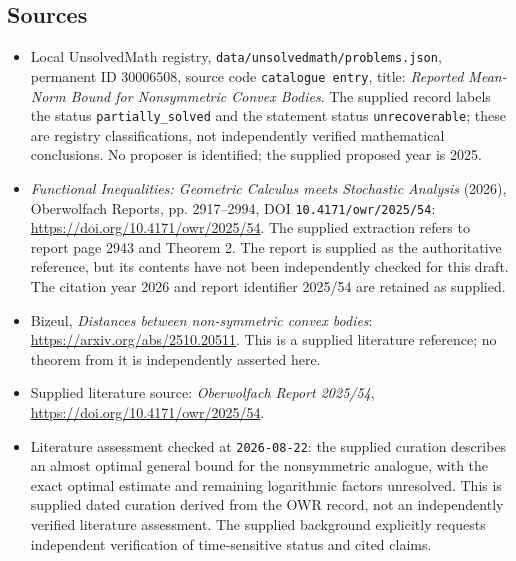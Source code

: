 \documentclass[11pt]{article}
\begin{document}
\subsection{Sources}
\begin{itemize}
\item Local UnsolvedMath registry, \texttt{data/unsolvedmath/problems.json}, permanent ID \(30006508\), source code \texttt{catalogue entry}, title: \emph{Reported Mean-Norm Bound for Nonsymmetric Convex Bodies}. The supplied record labels the status \texttt{partially\_solved} and the statement status \texttt{unrecoverable}; these are registry classifications, not independently verified mathematical conclusions. No proposer is identified; the supplied proposed year is 2025.
\item \emph{Functional Inequalities: Geometric Calculus meets Stochastic Analysis} (2026), Oberwolfach Reports, pp. 2917--2994, DOI \texttt{10.4171/owr/2025/54}: \url{https://doi.org/10.4171/owr/2025/54}. The supplied extraction refers to report page 2943 and Theorem 2. The report is supplied as the authoritative reference, but its contents have not been independently checked for this draft. The citation year 2026 and report identifier 2025/54 are retained as supplied.
\item Bizeul, \emph{Distances between non-symmetric convex bodies}: \url{https://arxiv.org/abs/2510.20511}. This is a supplied literature reference; no theorem from it is independently asserted here.
\item Supplied literature source: \emph{Oberwolfach Report 2025/54}, \url{https://doi.org/10.4171/owr/2025/54}.
\item Literature assessment checked at \texttt{2026-08-22}: the supplied curation describes an almost optimal general bound for the nonsymmetric analogue, with the exact optimal estimate and remaining logarithmic factors unresolved. This is supplied dated curation derived from the OWR record, not an independently verified literature assessment. The supplied background explicitly requests independent verification of time-sensitive status and cited claims.
\end{itemize}
\end{document}

